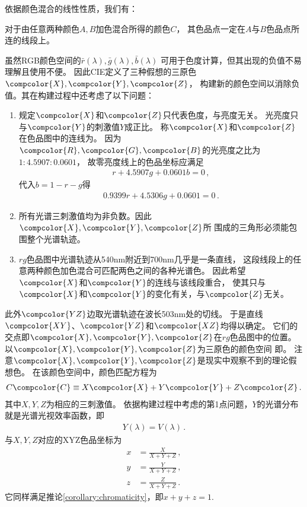 依据颜色混合的线性性质，我们有：
\begin{corollary}
      对于由任意两种颜色$A,B$加色混合所得的颜色$C$，
      其色品点一定在$A$与$B$色品点所连的线段上。
\end{corollary}

虽然RGB颜色空间的$\bar{r}(\lambda),\bar{g}(\lambda),\bar{b}(\lambda)$
可用于色度计算，但其出现的负值不易理解且使用不便。
因此CIE定义了三种假想的三原色$\compcolor{X},\compcolor{Y},\compcolor{Z}$，
构建新的颜色空间以消除负值。其在构建过程中还考虑了以下问题：
\begin{enumerate}
      \item 规定$\compcolor{X}$和$\compcolor{Z}$只代表色度，与亮度无关。
            光亮度只与$\compcolor{Y}$的刺激值$Y$成正比。
            称$\compcolor{X}$和$\compcolor{Z}$在色品图中的连线为。
            因为$\compcolor{R},\compcolor{G},\compcolor{B}$的光亮度之比为$1:4.5907:0.0601$，
            故零亮度线上的色品坐标应满足
            \begin{align}
                  r+4.5907g+0.0601b=0\, ,
            \end{align}
            代入$b=1-r-g$得
            \begin{align}
                  0.9399r+4.5306g+0.0601=0\, .
            \end{align}
      \item 所有光谱三刺激值均为非负数。因此$\compcolor{X},\compcolor{Y},\compcolor{Z}$所
            围成的三角形必须能包围整个光谱轨迹。
      \item $rg$色品图中光谱轨迹从540nm附近到700nm几乎是一条直线，
            这段线段上的任意两种颜色加色混合可匹配两色之间的各种光谱色。
            因此希望$\compcolor{X}$和$\compcolor{Y}$的连线与该线段重合，
            使其只与$\compcolor{X}$和$\compcolor{Y}$的变化有关，与$\compcolor{Z}$无关。
\end{enumerate}

此外$\compcolor{YZ}$边取光谱轨迹在波长503nm处的切线。
于是直线$\compcolor{XY}$、$\compcolor{YZ}$和$\compcolor{XZ}$均得以确定。
它们的交点即$\compcolor{X},\compcolor{Y},\compcolor{Z}$在$rg$色品图中的位置。
以$\compcolor{X},\compcolor{Y},\compcolor{Z}$为三原色的颜色空间
即。
注意$\compcolor{X},\compcolor{Y},\compcolor{Z}$是现实中观察不到的理论假想色。
在该颜色空间中，颜色匹配方程为
\begin{align}\label{eq:colormatchxyz}
      C\compcolor{C}\equiv X\compcolor{X}+Y\compcolor{Y}+Z\compcolor{Z}\, .
\end{align}
其中$X,Y,Z$为相应的三刺激值。
依据构建过程中考虑的第1点问题，$Y$的光谱分布就是光谱光视效率函数，即
\begin{align}
      Y(\lambda)=V(\lambda)\, .
\end{align}
与$X,Y,Z$对应的XYZ色品坐标为
\begin{align}
      x & =\frac{X}{X+Y+Z}\, , \\
      y & =\frac{Y}{X+Y+Z}\, , \\
      z & =\frac{Z}{X+Y+Z}\, .
\end{align}
它同样满足推论\ref{corollary:chromaticity}，即$x+y+z=1$.

